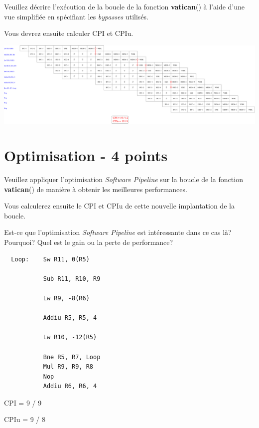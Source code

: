 Veuillez d\'ecrire l'ex\'ecution de la boucle de la fonction \textbf{vatican}()
\`a l'aide d'une vue simplifi\'ee en sp\'ecifiant les \textit{bypasses}
utilis\'es.

Vous devrez ensuite calculer CPI et CPIu.

\begin{correction}

  \begin{center}
    \includegraphics[scale=0.33]{figures/correction-analyse-simplifiee.pdf}
  \end{center}

\end{correction}

%
%

\section{Optimisation - 4 points}

Veuillez appliquer l'optimisation \textit{Software Pipeline} sur
la boucle de la fonction \textbf{vatican}() de mani\`ere \`a obtenir
les meilleures performances.

Vous calculerez ensuite le CPI et CPIu de cette nouvelle implantation
de la boucle.

Est-ce que l'optimisation \textit{Software Pipeline} est int\'eressante
dans ce cas l\`a? Pourquoi? Quel est le gain ou la perte de performance?

\begin{correction}

  \begin{verbatim}
  Loop:    Sw R11, 0(R5)

           Sub R11, R10, R9

           Lw R9, -8(R6)

           Addiu R5, R5, 4

           Lw R10, -12(R5)

           Bne R5, R7, Loop
           Mul R9, R9, R8
           Nop
           Addiu R6, R6, 4
  \end{verbatim}

  CPI = 9 / 9

  CPIu = 9 / 8

\end{correction}

